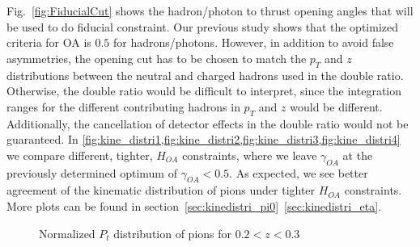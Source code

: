 Fig.~\ref{fig:FiducialCut} shows the hadron/photon to thrust opening angles that will be used to do fiducial constraint. Our previous study shows that the optimized criteria for OA is $0.5$ for hadrons/photons. 
However, in addition to avoid false asymmetries, the opening cut has to be chosen to match the $p_T$ and $z$ distributions between the neutral and charged hadrons used in the double ratio. Otherwise, the double ratio would be difficult to interpret, since the integration ranges for the different contributing hadrons in $p_T$ and $z$ would be different. Additionally, the cancellation of detector effects in the double ratio would not be guaranteed.
 In \cref{fig:kine_distri1,fig:kine_distri2,fig:kine_distri3,fig:kine_distri4} we compare different, tighter, $H_{OA}$ constraints, where we leave $\gamma_{OA}$ at the previously determined optimum of $\gamma_{OA}<0.5$.
  As expected, we see better agreement of the kinematic distribution of pions under tighter $H_{OA}$ constraints. More plots can be found in section~\ref{sec:kinedistri_pi0}~\ref{sec:kinedistri_eta}.
\begin{figure}[H]
\captionsetup[subfloat]{farskip=2pt,captionskip=1pt}
\centering
{}
\caption{Normalized $P_t$ distribution of pions for $0.2<z<0.3$}
\label{fig:kine_distri1}
\end{figure}

